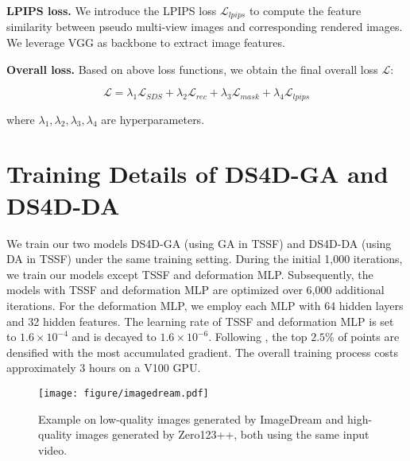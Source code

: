 \textbf{LPIPS loss.} We introduce the LPIPS loss $\mathcal{L}_{lpips}$ \cite{zhang2018unreasonable} to compute the feature similarity between pseudo multi-view images and corresponding rendered images. We leverage VGG \cite{simonyan2014very} as backbone to extract image features.

\textbf{Overall loss.} Based on above loss functions, we obtain the final overall loss $\mathcal{L}$:

\begin{equation}
    \mathcal{L} = \lambda_1\mathcal{L}_{SDS}+\lambda_2\mathcal{L}_{rec}+\lambda_3\mathcal{L}_{mask}+\lambda_4\mathcal{L}_{lpips}
\end{equation}

where $\lambda_1,\lambda_2,\lambda_3,\lambda_4$ are hyperparameters. 


\section{Training Details of DS4D-GA and DS4D-DA}
We train our two models DS4D-GA (using GA in TSSF) and DS4D-DA (using DA in TSSF) under the same training setting. During the initial 1,000 iterations, we train our models except TSSF and deformation MLP. Subsequently, the models with TSSF and deformation MLP are optimized over 6,000 additional iterations. For the deformation MLP, we employ each MLP with 64 hidden layers and 32 hidden features. The learning rate of TSSF and deformation MLP is set to $1.6\times10^{-4}$ and is decayed to $1.6\times10^{-6}$. Following \cite{zeng2024stag4d}, the top $2.5\%$ of points are densified with the most accumulated gradient. The overall training process costs approximately 3 hours on a V100 GPU. 

\begin{figure}[t]%
\centering
\texttt{[image: figure/imagedream.pdf]}
\caption{Example on low-quality images generated by ImageDream and high-quality images generated by Zero123++, both using the same input video.}\label{imagedream}
\end{figure}

